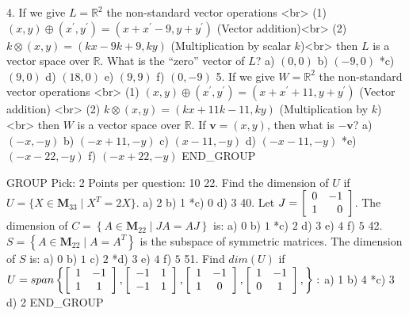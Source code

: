 4.  If we give $L=\mathbb{R}^{2}$ the non-standard vector operations <br>%
    (1) $(x,y)\oplus(x^{\prime},y^{\prime}) = (x+x^{\prime}-9,y+y^{\prime})$ (Vector addition)<br>
    (2) $k\otimes (x,y)=(kx-9k+9,ky)$ (Multiplication by scalar $k$)<br>
    then $L$ is a vector space over $\mathbb{R}$. What is the ``zero'' vector of $L$?
a)  $(0,0)$
b)  $(-9,0)$
*c) $(9,0)$
d)  $(18,0)$
e)  $(9,9)$
f)  $(0,-9)$
5.  If we give $W=\mathbb{R}^{2}$ the non-standard vector operations <br> %
    (1) $(x,y)\oplus(x^{\prime},y^{\prime}) = \left(x+x^{\prime}+11,y+y^{\prime }\right)$ (Vector addition) <br>
    (2)	$k\otimes (x,y)  = (kx+11k-11,ky)$ (Multiplication by $k$)<br>
    then $W$ is a vector space over $\mathbb{R}$. If $\mathbf{v}=(x,y)$, then what is $-\mathbf{v}$?
a)  $\left(-x,-y\right)$
b)  $\left(-x+11,-y\right)$
c)  $\left( x-11,-y\right)$
d)  $\left(-x-11,-y\right)$
*e) $\left(-x-22,-y\right)$
f)  $\left(-x+22,-y\right)$
END_GROUP

GROUP
Pick: 2
Points per question: 10
22. Find the dimension of $U$ if $U=\{X\in\mathbf{M}_{33}\mid X^{T}=2X\}$. %
a)  2
b)  1
*c) 0
d)  3
40. Let $J=\left[ %
    \begin{array}[c]{rr}
	0 &  -1\\
	1 &  0
    \end{array}
    \right]$. The dimension of $C=\left\{  A\in\mathbf{M}_{22}\mid JA=AJ\right\}$ is:
a)  $0$
b)  $1$
*c) $2$
d)  $3$
e)  $4$
f)  $5$
42. $S=\left\{  A\in\mathbf{M}_{22}\mid A=A^{T}\right\}$ is the subspace of symmetric matrices. The dimension of $S$ is: %
a)  $0$
b)  $1$
c)  $2$
*d) $3$
e)  $4$
f)  $5$
51. Find $dim(U)$ if $U=span\left\{\left[ %
    \begin{array}[c]{cc}
	1 &  -1\\
	1 &  1
    \end{array}
    \right],\left[
    \begin{array}[c]{cc}
	-1 &  1\\
	-1 &  1
    \end{array}
    \right],\left[
    \begin{array}[c]{cc}
	1 &  -1\\
	1 &  0
    \end{array}
    \right],\left[
    \begin{array}[c]{cc}
	1 &  -1\\
	0 &  1
    \end{array}
    \right],\right\}  :$
a)  1
b)  4
*c) 3
d)  2
END_GROUP


